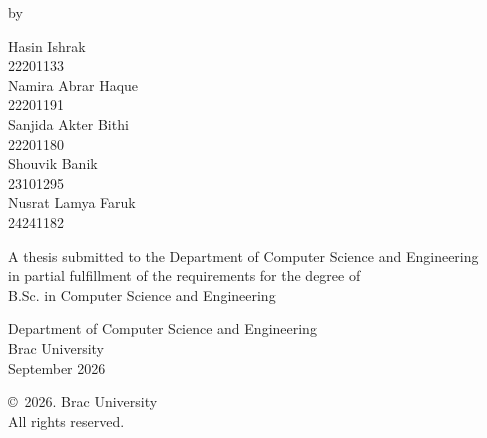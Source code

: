 \begin{titlepage}
\renewcommand*{\thepage}{Title}
\begin{center}
\vspace*{1.8cm}
{\fontsize{16pt}{22pt}\selectfont\thesistitle\par}
\vspace{1.1cm}
by
\vspace{0.5cm}

Hasin Ishrak\\22201133\\
Namira Abrar Haque\\22201191\\
Sanjida Akter Bithi\\22201180\\
Shouvik Banik\\23101295\\
Nusrat Lamya Faruk\\24241182

\vspace{1.2cm}
A thesis submitted to the Department of Computer Science and Engineering\\
in partial fulfillment of the requirements for the degree of\\
B.Sc. in Computer Science and Engineering

\vspace{1.5cm}
Department of Computer Science and Engineering\\
Brac University\\September 2026

\vspace{1.5cm}
\copyright\ 2026. Brac University\\All rights reserved.



\end{center}
\end{titlepage}
